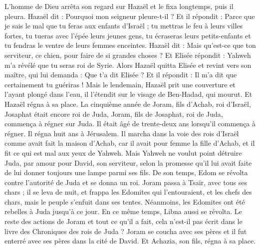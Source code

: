 \begin{multicols}{2}
L'homme de Dieu arrêta son regard sur Hazaël et le fixa longtemps, puis il pleura.
Hazaël dit : Pourquoi mon seigneur pleure-t-il ? Et il répondit : Parce que je sais le mal que tu feras aux enfants d'Israël ; tu mettras le feu à leurs villes fortes, tu tueras avec l'épée leurs jeunes gens, tu écraseras leurs petits-enfants et tu fendras le ventre de leurs femmes enceintes.
Hazaël dit : Mais qu'est-ce que ton serviteur, ce chien, pour faire de si grandes choses ? Et Elisée répondit : Yahweh m'a révélé que tu seras roi de Syrie.
Alors Hazaël quitta Elisée et revint vers son maître, qui lui demanda : Que t'a dit Elisée ? Et il répondit : Il m'a dit que certainement tu guériras !
Mais le lendemain, Hazaël prit une couverture et l'ayant plongé dans l'eau, il l'étendit sur le visage de Ben-Hadad, qui mourut. Et Hazaël régna à sa place.
La cinquième année de Joram, fils d'Achab, roi d'Israël, Josaphat était encore roi de Juda, Joram, fils de Josaphat, roi de Juda, commença à régner sur Juda.
Il était âgé de trente-deux ans lorsqu'il commença à régner. Il régna huit ans à Jérusalem.
Il marcha dans la voie des rois d'Israël comme avait fait la maison d'Achab, car il avait pour femme la fille d'Achab, et il fit ce qui est mal aux yeux de Yahweh.
Mais Yahweh ne voulut point détruire Juda, par amour pour David, son serviteur, selon la promesse qu'il lui avait faite de lui donner toujours une lampe parmi ses fils.
De son temps, Edom se révolta contre l'autorité de Juda et se donna un roi.
Joram passa à Tsaïr, avec tous ses chars ; il se leva de nuit, et frappa les Edomites qui l'entouraient, et les chefs des chars, mais le peuple s'enfuit dans ses tentes.
Néanmoins, les Edomites ont été rebelles à Juda jusqu'à ce jour. En ce même temps, Libna aussi se révolta.
Le reste des actions de Joram et tout ce qu'il a fait, cela n'est-il pas écrit dans le livre des Chroniques des rois de Juda ?
Joram se coucha avec ses pères et il fut enterré avec ses pères dans la cité de David. Et Achazia, son fils, régna à sa place.

\end{multicols}
